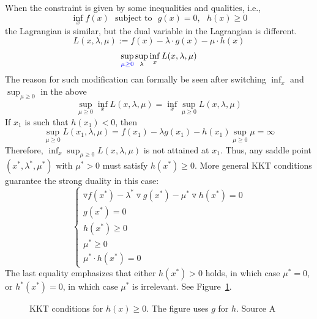 \documentclass[11pt]{book}
\begin{document}
When the constraint is given by some inequalities and qualities, i.e.,
\begin{equation}
    \label{constraint_optimization2}
    \inf_x f(x) ~~~ \textrm{subject to}~~~g(x)=0,~~~h(x)\ge 0
\end{equation}
the Lagrangian is similar, but
the dual variable in the Lagrangian is different.
\begin{equation}\label{lagrangian2}
    L(x,\lambda,\mu):= f(x) - \lambda \cdot g(x) - \mu \cdot h(x)
\end{equation}
\begin{equation}
    \sup_{{\color{blue}\mu\ge0}}\sup_{\lambda}\inf_{x}L(x,\lambda,\mu)
\end{equation}
The reason for such modification can formally be seen after switching $\inf_x$ and $\sup_{\mu\ge0}$ in the above
\begin{equation}
    \sup_{\mu\ge0}\inf_{x}L(x,\lambda,\mu) =\inf_{x}\sup_{\mu\ge0}L(x,\lambda,\mu)
\end{equation}
If $x_1$ is such that $h(x_1)<0$, then 
$$\sup_{\mu\ge0}L(x_1,\lambda,\mu)= f(x_1) - \lambda g(x_1) - h(x_1) \sup_{\mu\ge0} \mu =\infty$$
Therefore, $\inf_{x}\sup_{\mu\ge0}L(x,\lambda,\mu)$ is not attained at $x_1$. Thus, any saddle point $(x^*,\lambda^*,\mu^*)$ with $\mu^*>0$ must satisfy $h(x^*)\ge0$. More general KKT conditions guarantee the strong duality in this case:
    \begin{equation} \label{cond:KKT_general}
    \begin{cases} \triangledown f (x^*) - \lambda^* \triangledown g (x^*) -\mu^* \triangledown 
 h(x^*)= 0\\
            g(x^*)=0\\
            h(x^*)\ge0\\
            \mu^*\ge0\\
            \mu^*\cdot h(x^*)=0
        \end{cases}
    \end{equation}
The last equality emphasizes that either $h(x^*)>0$ holds, in which case $\mu^*=0$, or $h^*(x^*)=0$, in which case $\mu^*$ is irrelevant. See Figure~\ref{fig:KKT_2}.
\begin{figure}
    \centering

    \caption{KKT conditions for $h(x)\ge0$. The figure uses $g$ for $h$. Source A}
    \label{fig:KKT_2}
\end{figure}
\end{document}
